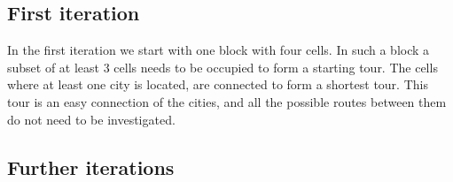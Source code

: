 \subsection{First iteration}
In the first iteration we start with one block with four cells. In such a
block a subset of at least 3 cells needs to be occupied to form a starting
tour. The cells where at least one city is located, are connected to form a
shortest tour. This tour is an easy connection of the cities, and all the
possible routes between them do not need to be investigated.

\subsection{Further iterations}


